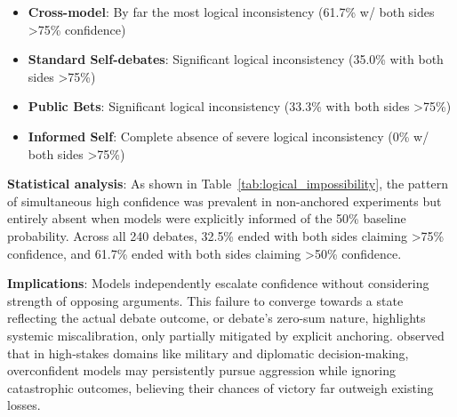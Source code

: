 \documentclass{article}
\begin{document}
\begin{itemize}
    \item \textbf{Cross-model}: By far the most logical inconsistency (61.7\% w/ both sides >75\% confidence)
    \item \textbf{Standard Self-debates}: Significant logical inconsistency (35.0\% with both sides >75\%)
    \item \textbf{Public Bets}: Significant logical inconsistency (33.3\% with both sides >75\%)
    \item \textbf{Informed Self}: Complete absence of severe logical inconsistency (0\% w/ both sides >75\%)
\end{itemize}

\textbf{Statistical analysis}: As shown in Table~\ref{tab:logical_impossibility}, the pattern of simultaneous high confidence was prevalent in non-anchored experiments but entirely absent when models were explicitly informed of the 50\% baseline probability. Across all 240 debates, 32.5\% ended with both sides claiming >75\% confidence, and 61.7\% ended with both sides claiming >50\% confidence.

\textbf{Implications}: Models independently escalate confidence without considering strength of opposing arguments. This failure to converge towards a state reflecting the actual debate outcome, or debate's zero-sum nature, highlights systemic miscalibration, only partially mitigated by explicit anchoring. \citet{Rivera_2024} observed that in high-stakes domains like military and diplomatic decision-making, overconfident models may persistently pursue aggression while ignoring catastrophic outcomes, believing their chances of victory far outweigh existing losses.
\end{document}
